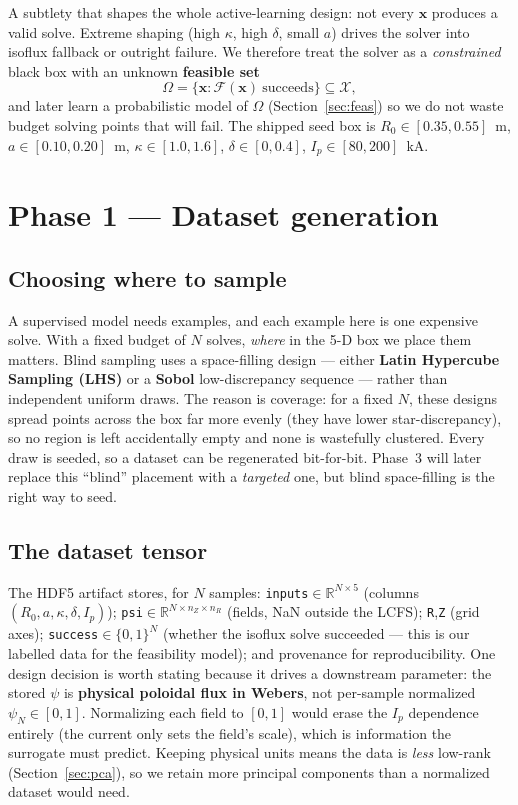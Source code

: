 \documentclass[11pt]{article}
\newcommand{\bx}{\mathbf{x}}
\newcommand{\Ffwd}{\mathcal{F}}
\newcommand{\R}{\mathbb{R}}
\begin{document}
A subtlety that shapes the whole active-learning design: not every $\bx$ produces a valid solve.
Extreme shaping (high $\kappa$, high $\delta$, small $a$) drives the solver into isoflux fallback
or outright failure. We therefore treat the solver as a \emph{constrained} black box with an
unknown \textbf{feasible set}
\begin{equation}
\Omega=\{\bx: \Ffwd(\bx)\ \text{succeeds}\}\subseteq\mathcal{X},
\end{equation}
and later learn a probabilistic model of $\Omega$ (Section~\ref{sec:feas}) so we do not waste
budget solving points that will fail. The shipped seed box is $R_0\in[0.35,0.55]$~m,
$a\in[0.10,0.20]$~m, $\kappa\in[1.0,1.6]$, $\delta\in[0,0.4]$, $I_p\in[80,200]$~kA.

\section{Phase 1 --- Dataset generation}

\subsection{Choosing where to sample}
A supervised model needs examples, and each example here is one expensive solve. With a fixed
budget of $N$ solves, \emph{where} in the 5-D box we place them matters. Blind sampling uses a
space-filling design --- either \textbf{Latin Hypercube Sampling (LHS)} or a \textbf{Sobol}
low-discrepancy sequence --- rather than independent uniform draws. The reason is coverage: for a
fixed $N$, these designs spread points across the box far more evenly (they have lower
star-discrepancy), so no region is left accidentally empty and none is wastefully clustered. Every
draw is seeded, so a dataset can be regenerated bit-for-bit. Phase~3 will later replace this
``blind'' placement with a \emph{targeted} one, but blind space-filling is the right way to seed.

\subsection{The dataset tensor}
The HDF5 artifact stores, for $N$ samples: \texttt{inputs}$\in\R^{N\times 5}$ (columns
$(R_0,a,\kappa,\delta,I_p)$); \texttt{psi}$\in\R^{N\times n_Z\times n_R}$ (fields, NaN outside the
LCFS); \texttt{R},\texttt{Z} (grid axes); \texttt{success}$\in\{0,1\}^N$ (whether the isoflux
solve succeeded --- this is our labelled data for the feasibility model); and provenance for
reproducibility. One design decision is worth stating because it drives a downstream parameter:
the stored $\psi$ is \textbf{physical poloidal flux in Webers}, not per-sample normalized
$\psi_N\in[0,1]$. Normalizing each field to $[0,1]$ would erase the $I_p$ dependence entirely
(the current only sets the field's scale), which is information the surrogate must predict. Keeping
physical units means the data is \emph{less} low-rank (Section~\ref{sec:pca}), so we retain more
principal components than a normalized dataset would need.
\end{document}
